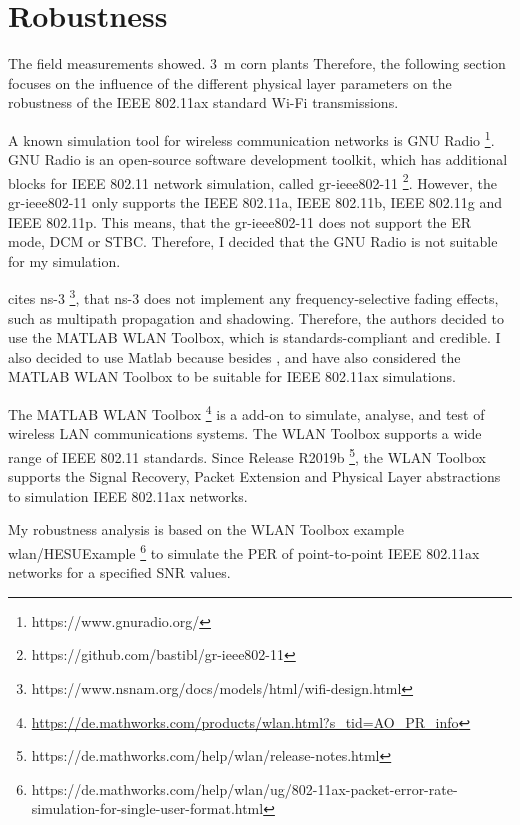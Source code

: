 \section{Robustness}
\label{sec:Robustness}
The field measurements showed.
\cite{smolnik_5g_2020} \SI{3}{\metre} corn plants
Therefore, the following section focuses on the influence of the different physical layer parameters on the robustness of the IEEE 802.11ax standard
Wi-Fi transmissions.

A known simulation tool for wireless communication networks is GNU Radio \footnote{https://www.gnuradio.org/}.
GNU Radio is an open-source software development toolkit, which has additional blocks for IEEE 802.11 network simulation,
called gr-ieee802-11 \footnote{https://github.com/bastibl/gr-ieee802-11}. However, the gr-ieee802-11 only
supports the IEEE 802.11a, IEEE 802.11b, IEEE 802.11g and IEEE 802.11p. This means, that the gr-ieee802-11 does not support
the \ac{ER} mode, \ac{DCM} or \ac{STBC}. Therefore, I decided that the GNU Radio is not suitable for my simulation.

\textcite{s_performance_2022} cites ns-3 \footnote{https://www.nsnam.org/docs/models/html/wifi-design.html},
that ns-3 does not implement
any frequency-selective fading effects, such as multipath propagation and shadowing. Therefore, the authors decided to use
the MATLAB WLAN Toolbox, which is standards-compliant and credible.
I also decided to use Matlab because besides \cite{s_performance_2022}, \cite{cao_efficient_2022} and \cite{jin_efficient_2021} have also considered
the MATLAB WLAN Toolbox to be suitable for IEEE 802.11ax simulations.

The MATLAB WLAN Toolbox \footnote{\url{https://de.mathworks.com/products/wlan.html?s_tid=AO_PR_info}} is a add-on to simulate, analyse, and test of wireless LAN communications systems.
The WLAN Toolbox supports a wide range of IEEE 802.11 standards.
Since Release R2019b \footnote{https://de.mathworks.com/help/wlan/release-notes.html}, the WLAN Toolbox supports the Signal Recovery, Packet Extension and Physical Layer abstractions to simulation IEEE 802.11ax networks.

My robustness analysis is based on the WLAN Toolbox example wlan/HESUExample \footnote{https://de.mathworks.com/help/wlan/ug/802-11ax-packet-error-rate-simulation-for-single-user-format.html} to simulate the \ac{PER} of point-to-point IEEE 802.11ax networks for
a specified \ac{SNR} values.

